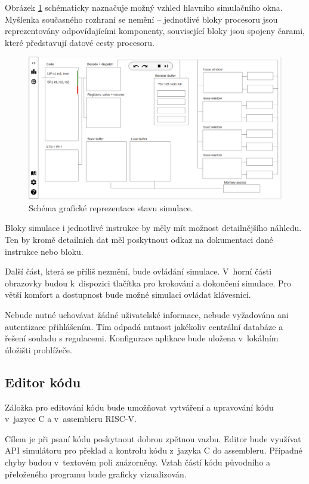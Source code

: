 Obrázek \ref{main_view_design} schématicky naznačuje možný vzhled hlavního simulačního okna.
Myšlenka současného rozhraní se nemění -- jednotlivé bloky procesoru jsou reprezentovány odpovídajícími komponenty, související bloky jsou spojeny čarami, které představují datové cesty procesoru.

\begin{figure}[ht]
    \includegraphics[width=\textwidth]{obrazky-figures/main_view_design.png}
    \caption{Schéma grafické reprezentace stavu simulace.}
    \label{main_view_design}
\end{figure}

Bloky simulace i jednotlivé instrukce by měly mít možnost detailnějšího náhledu.
Ten by kromě detailních dat měl poskytnout odkaz na dokumentaci dané instrukce nebo bloku.

Další část, která se příliš nezmění, bude ovládání simulace.
V~horní části obrazovky budou k~dispozici tlačítka pro krokování a dokončení simulace.
Pro větší komfort a dostupnost bude možné simulaci ovládat klávesnicí.

Nebude nutné uchovávat žádné uživatelské informace, nebude vyžadována ani autentizace přihlášením.
Tím odpadá nutnost jakékoliv centrální databáze a řešení souladu s regulacemi.
Konfigurace aplikace bude uložena v~lokálním úložišti prohlížeče.

\subsection{Editor kódu}

Záložka pro editování kódu bude umožňovat vytváření a upravování kódu v~jazyce C a v~assembleru RISC-V.

Cílem je při psaní kódu poskytnout dobrou zpětnou vazbu.
Editor bude využívat API simulátoru pro překlad a kontrolu kódu z~jazyka C do assembleru.
Případné chyby budou v~textovém poli znázorněny.
Vztah částí kódu původního a přeloženého programu bude graficky vizualizován.

